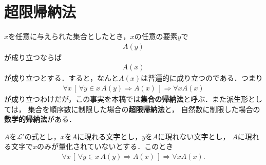 \section{超限帰納法}
	$x$を任意に与えられた集合としたとき，$x$の任意の要素$y$で
	\begin{align}
		A(y)
	\end{align}
	が成り立つならば
	\begin{align}
		A(x)
	\end{align}
	が成り立つとする．すると，なんと$A(x)$は普遍的に成り立つのである．つまり
	\begin{align}
		\forall x\, \left[\, \forall y \in x\, A(y) \Longrightarrow A(x)\, \right]
		\Longrightarrow \forall x A(x)
	\end{align}
	が成り立つわけだが，この事実を本稿では{\bf 集合の帰納法}と呼ぶ．また派生形としては，
	集合を順序数に制限した場合の{\bf 超限帰納法}と，
	自然数に制限した場合の{\bf 数学的帰納法}がある．
	
	\begin{screen}
		\begin{thm}[集合の帰納法]\label{thm:equivalent_condition_of_axiom_of_regularity}
			$A$を$\mathcal{L}'$の式とし，$x$を$A$に現れる文字とし，$y$を$A$に現れない文字とし，
			$A$に現れる文字で$x$のみが量化されていないとする．このとき
			\begin{align}
				\forall x\, \left[\, \forall y \in x\, A(y) \Longrightarrow A(x)\, \right]
				\Longrightarrow \forall x A(x).
			\end{align}
		\end{thm}
	\end{screen}
	
